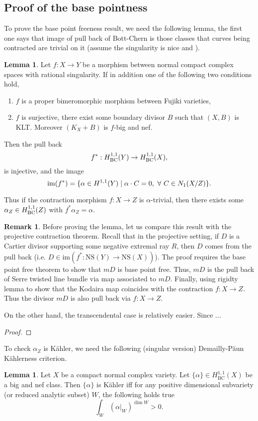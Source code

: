 \documentclass[11pt]{article}
\theoremstyle{definition}
\newtheorem{lemma}[theorem]{Lemma}
\newtheorem{remark}[theorem]{Remark}
\begin{document}
	\subsection{Proof of the base pointness}
	To prove the base point freeness result, we need the following lemma, the first one says that image of pull back of Bott-Chern is those classes that curves being contracted are trivial on it (assume the singularity is nice and ).
	\begin{lemma}\label{pullBC}
		Let $f:X\to Y$ be a morphism between normal compact complex spaces with rational singularity. If in addition one of the following two conditions hold,
		\begin{enumerate}
			\item $f$ is a proper bimeromorphic morphism between Fujiki varieties,
			\item $f$ is surjective, there exist some boundary divisor $B$ such that $(X,B)$ is KLT. Moreover $(K_X+B)$ is $f$-big and nef.
		\end{enumerate}
		Then the pull back $$f^* : H^{1,1}_{\rm{BC}}(Y) \to H^{1,1}_{\rm{BC}}(X),$$is injective, and the image $${\rm{im}}(f^*) = \{\alpha \in H^{1,1}_{\rm}(Y)\mid \alpha \cdot C = 0,\  \forall\ C\in N_1(X/Z)\}.$$
	\end{lemma}
	Thus if the contraction morphism $f:X\to Z$ is $\alpha$-trivial, then there exists some $\alpha_Z \in H^{1,1}_{\rm{BC}}(Z)$ with $f^* \alpha_Z = \alpha$.
	
	
	\begin{remark}
		Before proving the lemma, let us compare this result with the projective contraction theorem. Recall that in the projective setting, if $D$ is a Cartier divisor supporting some negative extremal ray $R$, then $D$ comes from the pull back (i.e. $D\in \text{im}(f^* : \text{NS}(Y) \to \text{NS}(X))$). The proof requires the base point free theorem to show that $mD$ is base point free. Thus, $mD$ is the pull back of Serre twisted line bundle via map associated to $mD$. Finally, using rigidty lemma to show that the Kodaira map coincides with the contraction $f:X\to Z$. Thus the divisor $mD$ is also pull back via $f:X\to Z$.
		
		On the other hand, the transcendental case is relatively easier. Since ... 
	\end{remark}
	\begin{proof}
		
	\end{proof}
	To check $\alpha_Z$ is K\"ahler, we need the following (singular version) Demailly-P\u{a}un K\"ahlerness criterion. 
	\begin{lemma}\label{DPcriterion}
		Let $X$ be a compact normal complex variety. Let $\{\alpha\}\in H^{1,1}_{\text{BC}}(X)$ be a big and nef class. Then $\{\alpha\}$ is K\"ahler iff for any positive dimensional subvariety (or reduced analytic subset) $W$, the following holds true $$\int_W  (\alpha|_W)^{\dim W}>0.$$
	\end{lemma}
	
\end{document}
